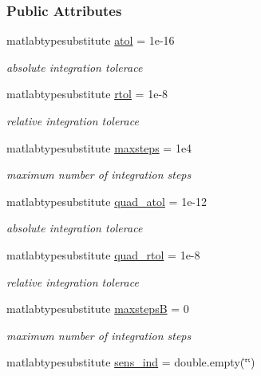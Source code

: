 \subsubsection*{Public Attributes}
\begin{DoxyCompactItemize}
\item 
matlabtypesubstitute \mbox{\hyperlink{classamioption_a0c5f3dcf809a17b895fe12fc91272349}{atol}} = 1e-\/16
\begin{DoxyCompactList}\small\item\em absolute integration tolerace \end{DoxyCompactList}\item 
matlabtypesubstitute \mbox{\hyperlink{classamioption_a7978e9a4674f869e6b2950e2f6262ca5}{rtol}} = 1e-\/8
\begin{DoxyCompactList}\small\item\em relative integration tolerace \end{DoxyCompactList}\item 
matlabtypesubstitute \mbox{\hyperlink{classamioption_ac37622882dacee1f11688d4941ccb45e}{maxsteps}} = 1e4
\begin{DoxyCompactList}\small\item\em maximum number of integration steps \end{DoxyCompactList}\item 
matlabtypesubstitute \mbox{\hyperlink{classamioption_ad77eb68a40bc4659c33df68b373f3fd7}{quad\+\_\+atol}} = 1e-\/12
\begin{DoxyCompactList}\small\item\em absolute integration tolerace \end{DoxyCompactList}\item 
matlabtypesubstitute \mbox{\hyperlink{classamioption_ae6739de7f62871e1b32700da8d8d4c2f}{quad\+\_\+rtol}} = 1e-\/8
\begin{DoxyCompactList}\small\item\em relative integration tolerace \end{DoxyCompactList}\item 
matlabtypesubstitute \mbox{\hyperlink{classamioption_aca33b56e266b489d1211688e3c223704}{maxstepsB}} = 0
\begin{DoxyCompactList}\small\item\em maximum number of integration steps \end{DoxyCompactList}\item 
matlabtypesubstitute \mbox{\hyperlink{classamioption_a0505783cf66f362672cbe3320d47a94d}{sens\+\_\+ind}} = double.\+empty(\char`\"{}\char`\"{})

\end{DoxyCompactItemize}
